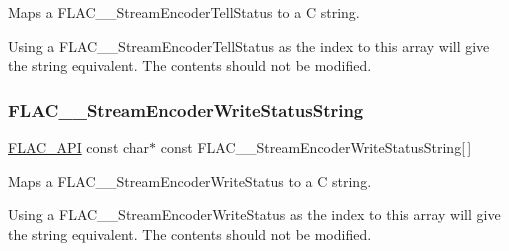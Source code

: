 Maps a F\+L\+A\+C\+\_\+\+\_\+\+Stream\+Encoder\+Tell\+Status to a C string.

Using a F\+L\+A\+C\+\_\+\+\_\+\+Stream\+Encoder\+Tell\+Status as the index to this array will give the string equivalent. The contents should not be modified. \mbox{\label{group__flac__stream__encoder_ga00e6218364ced330f52c625061dfa485}} 
\subsubsection{\texorpdfstring{FLAC\_\_StreamEncoderWriteStatusString}{FLAC\_\_StreamEncoderWriteStatusString}}
{\footnotesize\ttfamily \mbox{\hyperlink{group__flac__export_ga56ca07df8a23310707732b1c0007d6f5}{F\+L\+A\+C\+\_\+\+A\+PI}} const char$\ast$ const F\+L\+A\+C\+\_\+\+\_\+\+Stream\+Encoder\+Write\+Status\+String\mbox{[}$\,$\mbox{]}}

Maps a F\+L\+A\+C\+\_\+\+\_\+\+Stream\+Encoder\+Write\+Status to a C string.

Using a F\+L\+A\+C\+\_\+\+\_\+\+Stream\+Encoder\+Write\+Status as the index to this array will give the string equivalent. The contents should not be modified. 